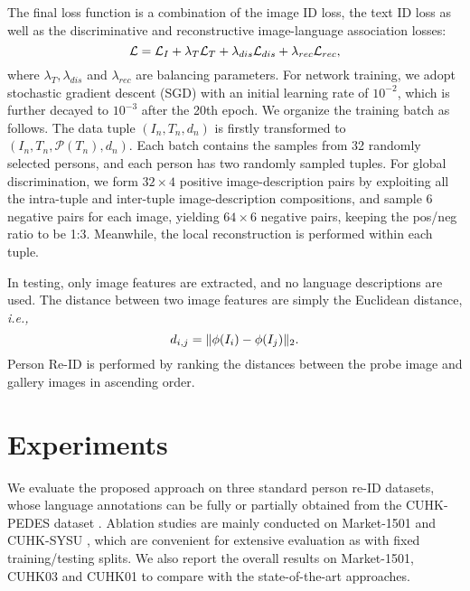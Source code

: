\documentclass[runningheads]{llncs}
\begin{document}
The final loss function is a combination of the image ID loss, the text ID loss as well as the discriminative and reconstructive image-language association losses:
\begin{equation} \small
\mathcal{L} = \mathcal{L}_{I}+ \lambda_{T}\mathcal{L}_{T}+ \lambda_{dis} \mathcal{L}_{dis}+\lambda_{rec} \mathcal{L}_{rec}, \label{Eqn:jointloss}
\end{equation}
where $\lambda_{T}, \lambda_{dis}$ and $\lambda_{rec}$ are balancing parameters. For network training, we adopt stochastic gradient descent (SGD) with an initial learning rate of $10^{-2}$, which is further decayed to $10^{-3}$ after the 20th epoch.  We organize the training batch as follows.
The data tuple $(I_{n}, T_{n}, d_{n})$ is firstly transformed to $(I_{n}, T_{n}, \mathcal{P}(T_{n}), d_{n})$.  Each batch contains the samples from 32 randomly selected persons, and each person has two randomly sampled tuples. For global discrimination, we form  $32 \times 4$ positive image-description pairs by exploiting all the intra-tuple and inter-tuple image-description compositions, and sample 6 negative pairs for each image, yielding $64\times 6$ negative pairs, keeping the pos/neg ratio to be 1:3. Meanwhile, the local reconstruction is performed within each tuple.

In testing, only image features are extracted, and no language descriptions are used. The distance between two image features are simply the Euclidean distance, \emph{i.e.,}
\begin{equation}\small
  d_{i,j} = \|\phi(I_{i}) - \phi(I_{j})\|_{2}.
\end{equation}
Person Re-ID is performed by ranking the distances between the probe image and gallery images in ascending order.








\section{Experiments}


We evaluate the proposed approach on three standard person re-ID datasets, whose language annotations can be fully or partially obtained from the CUHK-PEDES dataset \cite{Lishuang_2017_CVPR}. Ablation studies are mainly conducted on Market-1501 \cite{zheng2015scalable} and CUHK-SYSU \cite{journals/corr/XiaoLWLW16}, which are  convenient for extensive evaluation as with fixed training/testing splits. We also report the overall results on Market-1501, CUHK03\cite{Li_2014_CVPR} and CUHK01\cite{li2012human} to compare with the state-of-the-art approaches.
\end{document}

